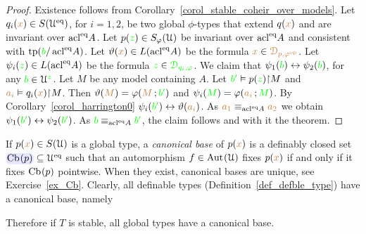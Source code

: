 \documentclass[creche.tex]{subfiles}
\begin{document}
\begin{proof}
  Existence follows from Corollary~\ref{corol_stable_coheir_over_models}.
  Let $q_i({\color{brown} x})\in S(\EuScript U^{{\rm eq}})$, for $i=1,2$, be two global $\phi$-types that extend $q({\color{brown} x})$ and are invariant over $\mathop{\rm acl}^{{\rm eq}}\!A$.
  Let $p({\color{green} z})\in S_\varphi(\EuScript U)$ be invariant over $\mathop{\rm acl}^{{\rm eq}}\!A$ and consistent with ${\rm tp}({\color{green} b}/\mathop{\rm acl}^{{\rm eq}}\!A)$.
  Let $\vartheta({\color{brown} x})\in L(\mathop{\rm acl}^{{\rm eq}}\!A)$ be the formula ${\color{brown} x}\in{\color{brown}\EuScript D_{p,\varphi^{\rm op}}}$.
  Let $\psi_i({\color{green} z})\in L(\mathop{\rm acl}^{{\rm eq}}\!A)$ be the formula ${\color{green} z}\in{\color{green}\EuScript D_{q_i,\varphi}}$.
  We claim that $\psi_1({\color{green} b})\leftrightarrow\psi_2({\color{green} b})$, for any ${\color{green} b}\in\EuScript U^{\color{green} z}$.
  Let $M$ be any model containing $A$.
  Let ${\color{green} b'}\vDash p({\color{green} z}){\restriction}M$ and ${\color{brown} a_i}\vDash q_i({\color{brown} x}){\restriction}M$.
  Then $\vartheta({\color{brown} M})=\varphi({\color{brown} M}\,;{\color{green} b'})$ and $\psi_i({\color{green} M})=\varphi({\color{brown} a_i}\,;{\color{green} M})$.
  By Corollary~\ref{corol_harrington0} $\psi_i({\color{green} b'})\leftrightarrow\vartheta({\color{brown} a_i})$.
  As ${\color{brown} a_1}\equiv_{\mathop{\rm acl}^{{\rm eq}}\!A}{\color{brown} a_2}$ we obtain $\psi_1({\color{green} b'})\leftrightarrow\psi_2({\color{green} b'})$.
  As ${\color{green} b}\equiv_{\mathop{\rm acl}^{{\rm eq}}\!A}{\color{green} b'}$, the claim follows and with it the theorem.
\end{proof}

If $p({\color{brown} x})\in S(\EuScript U)$ is a global type, a \emph{canonical base\/} of $p({\color{brown} x})$ is a definably closed set $\emph{$\Cb(p)$}\subseteq \U^\eq$ such that an automorphism $f\in{\rm Aut\kern.15ex}(\EuScript U)$ fixes $p({\color{brown} x})$ if and only if it fixes ${\rm Cb\kern.15ex}(p)$ pointwise. When they exist, canonical bases are unique, see Exercise~\ref{ex_Cb}.
Clearly, all definable types (Definition~\ref{def_defble_type}) have a canonical base, namely


Therefore if $T$ is stable, all global types have a canonical base.

\end{document}
